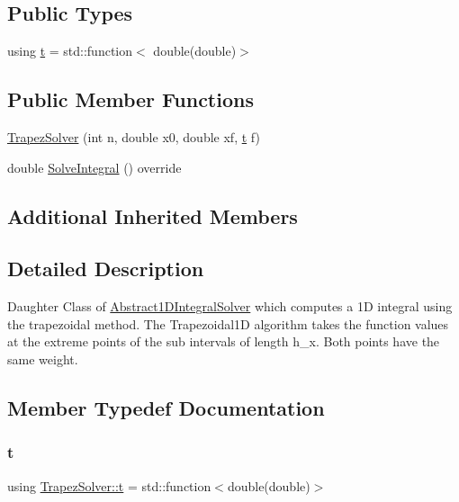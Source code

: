 \subsection*{Public Types}
\begin{DoxyCompactItemize}
\item 
using \hyperlink{class_trapez_solver_ac94a3e89df0d6bacc7d62e3784fd4162}{t} = std\+::function$<$ double(double)$>$
\end{DoxyCompactItemize}
\subsection*{Public Member Functions}
\begin{DoxyCompactItemize}
\item 
\hyperlink{class_trapez_solver_aacba017d146636c666dff931f6c43323}{Trapez\+Solver} (int n, double x0, double xf, \hyperlink{class_abstract1_d_integral_solver_a7d8e60dfe7eb70e5c19dd71ac0b03880}{t} f)
\item 
double \hyperlink{class_trapez_solver_a15651e2fba081b87b484a83fc424c81d}{Solve\+Integral} () override
\end{DoxyCompactItemize}
\subsection*{Additional Inherited Members}


\subsection{Detailed Description}
Daughter Class of \hyperlink{class_abstract1_d_integral_solver}{Abstract1\+D\+Integral\+Solver} which computes a 1D integral using the trapezoidal method. The Trapezoidal1D algorithm takes the function values at the extreme points of the sub intervals of length h\+\_\+x. Both points have the same weight. 

\subsection{Member Typedef Documentation}
\mbox{\label{class_trapez_solver_ac94a3e89df0d6bacc7d62e3784fd4162}} 
\subsubsection{\texorpdfstring{t}{t}}
{\footnotesize\ttfamily using \hyperlink{class_trapez_solver_ac94a3e89df0d6bacc7d62e3784fd4162}{Trapez\+Solver\+::t} =  std\+::function$<$double(double)$>$}

